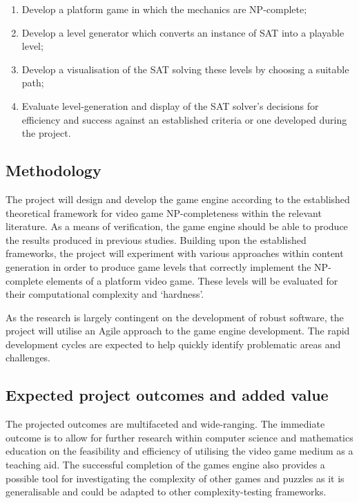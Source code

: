 \documentclass[a4paper]{article}
\begin{document}
\begin{enumerate}

  \item Develop a platform game in which the mechanics are NP-complete; \vspace{-3mm}
  \item Develop a level generator which converts an instance of SAT into a playable level; \vspace{-3mm}
  \item Develop a visualisation of the SAT solving these levels by choosing a suitable path;   \vspace{-3mm}
  \item Evaluate level-generation and display of the SAT solver's decisions for efficiency and success against an
        established criteria or one developed during the project. \vspace{-3mm}

\end{enumerate}

\subsection{Methodology}

The project will design and develop the game engine according to the established theoretical
framework for video game NP-completeness within the relevant literature. As a means of verification,
the game engine should be able to produce the results produced in previous studies. Building upon
the established frameworks, the project will experiment with various approaches within content
generation in order to produce game levels that correctly implement the NP-complete elements of a
platform video game. These levels will be evaluated for their computational complexity and
`hardness'.

As the research is largely contingent on the development of robust software, the project will
utilise an Agile approach to the game engine development. The rapid development cycles are expected
to help quickly identify problematic areas and challenges.

\subsection{Expected project outcomes and added value}

The projected outcomes are multifaceted and wide-ranging. The immediate outcome is to allow
for further research within computer science and mathematics education on the feasibility and
efficiency of utilising the video game medium as a teaching aid. The successful completion of the
games engine also provides a possible tool for investigating the complexity of other games and
puzzles as it is generalisable and could be adapted to other complexity-testing frameworks.
\end{document}
